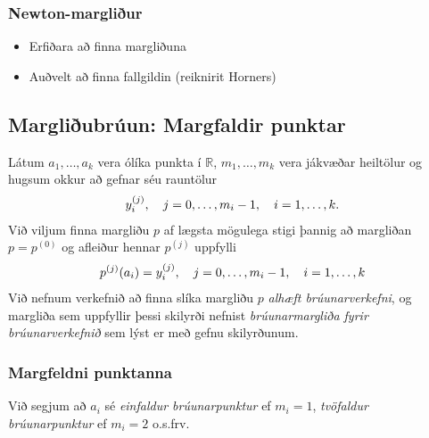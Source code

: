 \documentclass[a4paper,10pt,icelandic]{sphinxmanual}
\begin{document}
\subsubsection{Newton-margliður}
\label{kafli03:newton-margliur}\begin{itemize}
\item {} 
Erfiðara að finna margliðuna

\item {} 
Auðvelt að finna fallgildin (reiknirit Horners)

\end{itemize}


\subsection{Margliðubrúun: Margfaldir punktar}
\label{kafli03:index-12}\label{kafli03:margliubruun-margfaldir-punktar}
Látum \(a_1, \ldots, a_k\) vera ólíka punkta í
\({{\mathbb  R}}\), \(m_1, \ldots, m_k\) vera jákvæðar heiltölur
og hugsum okkur að gefnar séu rauntölur
\begin{gather}
\begin{split}y_i^{(j)}, \quad j = 0, \ldots, m_i-1, \quad i = 1, \ldots, k.\end{split}\notag
\end{gather}
Við viljum finna margliðu \(p\) af lægsta mögulega stigi þannig að
margliðan \(p=p^{(0)}\) og afleiður hennar \(p^{(j)}\) uppfylli
\begin{gather}
\begin{split}p^{(j)}(a_i) = y_i^{(j)},
  \quad j = 0, \ldots, m_i-1, \quad i = 1, \ldots, k\end{split}\notag
\end{gather}
Við nefnum verkefnið að finna slíka margliðu \(p\) \emph{alhæft
brúunarverkefni}, og margliða sem uppfyllir þessi skilyrði nefnist
\emph{brúunarmargliða fyrir brúunarverkefnið} sem lýst er með gefnu
skilyrðunum.


\subsubsection{Margfeldni punktanna}
\label{kafli03:margfeldni-punktanna}\label{kafli03:index-13}
Við segjum að \(a_i\) sé \emph{einfaldur brúunarpunktur} ef
\(m_i=1\), \emph{tvöfaldur brúunarpunktur} ef \(m_i=2\) o.s.frv.
\end{document}
